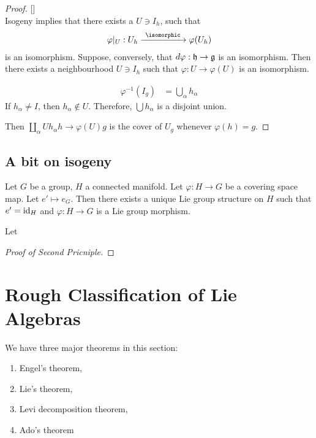 \begin{proof}  {[]} \\
Isogeny implies that there exists a $U\ni I_h$, such that
\begin{align}
    \varphi|_U : U_h \xrightarrow{\ \isomorphic\ } \varphi(U_h)
\end{align}
is an isomorphism.
Suppose, conversely, that $d\varphi: \mathfrak{h}\to \mathfrak{g}$ is an isomorphism. Then there exists a neighbourhood $U\ni I_h$ such that $    \varphi: U\to \varphi(U)$ is an isomorphism.

\begin{align}
    \varphi^{-1} (I_g) &= \bigcup_\alpha h_\alpha 
\end{align}
If $h_\alpha \neq I$, then $h_\alpha \not\in U$. Therefore, $\bigcup h_\alpha$ is a disjoint union.


Then $\coprod_\alpha U h_\alpha h\to \varphi(U)g$  is the cover of $U_g$ whenever $\varphi(h)=g$.

\end{proof}

\subsection{A bit on isogeny}
\label{sub:a_bit_on_isogeny}

Let $G$ be a group, $H$ a connected manifold. Let $\varphi: H\to G$ be a covering space map. Let $e' \mapsto e_G$. Then there exists a unique Lie group structure on $H$ such that  $e' = \operatorname{id}_H$ and $\varphi: H\to G$ is a Lie group morphism.

\begin{proposition}
   Let   
\end{proposition}

\begin{proof}[Proof of Second Pricniple]
\end{proof}

\section{Rough Classification of Lie Algebras}
\label{sec:rough_classification_of_lie_algebras}

We have three major theorems in this section:
\begin{enumerate}
    \makethislistcompact
    \item Engel's theorem,
    \item Lie's theorem,
    \item Levi decomposition theorem,
    \item Ado's theorem
\end{enumerate}

